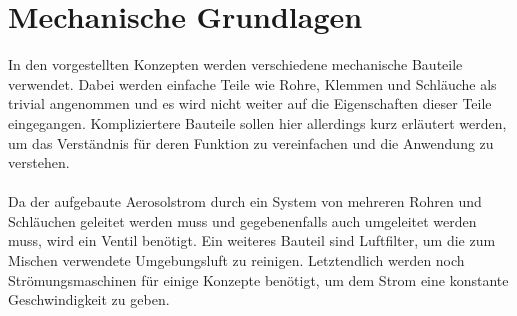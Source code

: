 \section{Mechanische Grundlagen}
In den vorgestellten Konzepten werden verschiedene mechanische Bauteile verwendet. Dabei werden einfache Teile wie Rohre, Klemmen und Schl\"{a}uche als trivial angenommen und es wird nicht weiter auf die Eigenschaften dieser Teile eingegangen. Kompliziertere Bauteile sollen hier allerdings kurz erl\"{a}utert werden, um das Verst\"{a}ndnis f\"{u}r deren Funktion zu vereinfachen und die Anwendung zu verstehen.
\\\\
Da der aufgebaute Aerosolstrom durch ein System von mehreren Rohren und Schl\"{a}uchen geleitet werden muss und gegebenenfalls auch umgeleitet werden muss, wird ein Ventil ben\"{o}tigt. Ein weiteres Bauteil sind Luftfilter, um die zum Mischen verwendete Umgebungsluft zu reinigen. Letztendlich werden noch Str\"{o}mungsmaschinen f\"{u}r einige Konzepte ben\"{o}tigt, um dem Strom eine konstante Geschwindigkeit zu geben.

